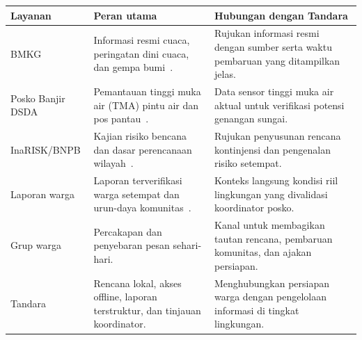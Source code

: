 {\fontsize{9.3}{12.5}\selectfont
\begin{tabularx}{\linewidth}{@{}P{25mm}YY@{}}
\toprule{}\textbf{Layanan} & \textbf{Peran utama} & \textbf{Hubungan dengan Tandara}\\\midrule
BMKG & Informasi resmi cuaca, peringatan dini cuaca, dan gempa bumi~\cite{bmkgcap,bmkgforecast,bmkggempa}. & Rujukan informasi resmi dengan sumber serta waktu pembaruan yang ditampilkan jelas.\\
Posko Banjir DSDA & Pemantauan tinggi muka air (TMA) pintu air dan pos pantau~\cite{poskobanjir}. & Data sensor tinggi muka air aktual untuk verifikasi potensi genangan sungai.\\
InaRISK/BNPB & Kajian risiko bencana dan dasar perencanaan wilayah~\cite{inarisk,uu24}. & Rujukan penyusunan rencana kontinjensi dan pengenalan risiko setempat.\\
Laporan warga & Laporan terverifikasi warga setempat dan urun-daya komunitas~\cite{petaapi}. & Konteks langsung kondisi riil lingkungan yang divalidasi koordinator posko.\\
Grup warga & Percakapan dan penyebaran pesan sehari-hari. & Kanal untuk membagikan tautan rencana, pembaruan komunitas, dan ajakan persiapan.\\
Tandara & Rencana lokal, akses offline, laporan terstruktur, dan tinjauan koordinator. & Menghubungkan persiapan warga dengan pengelolaan informasi di tingkat lingkungan.\\\bottomrule
\end{tabularx}}
